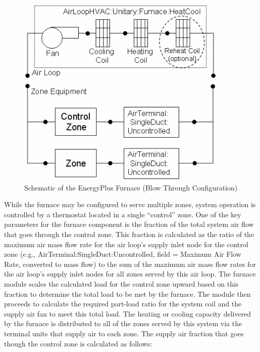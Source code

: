 \begin{figure}[hbtp] %
\centering
\includegraphics[width=0.9\textwidth, height=0.9\textheight, keepaspectratio=true]{media/image5019.png}
\caption{Schematic of the EnergyPlus Furnace (Blow Through Configuration) \protect \label{fig:schematic-of-the-energyplus-furnace-blow}}
\end{figure}

While the furnace may be configured to serve multiple zones, system operation is controlled by a thermostat located in a single ``control'' zone. One of the key parameters for the furnace component is the fraction of the total system air flow that goes through the control zone. This fraction is calculated as the ratio of the maximum air mass flow rate for the air loop's supply inlet node for the control zone (e.g., AirTerminal:SingleDuct:Uncontrolled, field = Maximum Air Flow Rate, converted to mass flow) to the sum of the maximum air mass flow rates for the air loop's supply inlet nodes for all zones served by this air loop. The furnace module scales the calculated load for the control zone upward based on this fraction to determine the total load to be met by the furnace. The module then proceeds to calculate the required part-load ratio for the system coil and the supply air fan to meet this total load. The heating or cooling capacity delivered by the furnace is distributed to all of the zones served by this system via the terminal units that supply air to each zone. The supply air fraction that goes though the control zone is calculated as follows:

